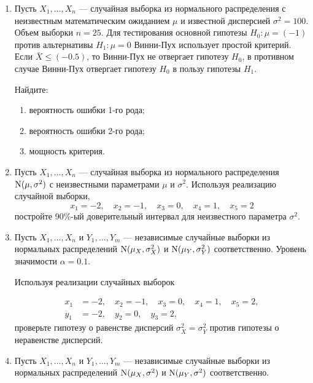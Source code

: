 \begin{enumerate}

\item Пусть $X_{1}, \ldots, X_{n}$ — случайная выборка из нормального распределения с неизвестным математическим ожиданием $\mu$ и известной дисперсией $\sigma^2=100$. Объем выборки $n=25$. Для тестирования основной гипотезы $H_{0}:\mu=(-1)$ против альтернативы $H_{1}:\mu=0$ Винни-Пух использует простой критерий. Если $\bar X \leq (-0.5)$, то Винни-Пух не отвергает гипотезу $H_{0}$, в противном случае Винни-Пух отвергает гипотезу $H_{0}$ в пользу гипотезы $H_{1}$. 

Найдите:

\begin{enumerate}
    \item вероятность ошибки 1-го рода;
    \item вероятность ошибки 2-го рода;
    \item мощность критерия.
\end{enumerate}

\item Пусть $X_{1}, \ldots, X_{n}$ — случайная выборка из нормального распределения $\mathrm{N}(\mu, \sigma^2)$ с неизвестными параметрами $\mu$ и ${\sigma}^2$.
Используя реализацию случайной выборки,
\[
x_{1} = -2, \quad x_{2} = -1, \quad x_{3} = 0, \quad x_{4} = 1, \quad x_{5} = 2
\]
постройте 90\%-ый доверительный интервал для неизвестного параметра $\sigma^2$.

\item Пусть $X_{1}, \ldots, X_{n}$ и $Y_{1}, \ldots, Y_{m}$ — независимые случайные
выборки из нормальных распределений $\mathrm{N}(\mu_{X},\sigma^2_{X})$ и
$\mathrm{N}(\mu_{Y},\sigma^2_{Y})$ соответственно.
Уровень значимости $\alpha = 0.1$.

Используя реализации случайных выборок

\begin{align*}
x_{1} &= -2, \quad x_{2} = -1, \quad x_{3} = 0, \quad x_{4} = 1, \quad x_{5} = 2, \\
y_{1} &= -2, \quad y_{2} = 0, \quad y_{3} = 2,
\end{align*}
проверьте гипотезу о равенстве дисперсий $\sigma^2_X = \sigma^2_Y$ против гипотезы о неравенстве дисперсий.

\item Пусть $X_{1}, \ldots, X_{n}$ и $Y_{1}, \ldots, Y_{m}$ —
независимые случайные выборки из нормальных распределений 
$\mathrm{N}(\mu_{X},\sigma^2)$ и $\mathrm{N}(\mu_{Y},\sigma^2)$ соответственно.


\end{enumerate}
